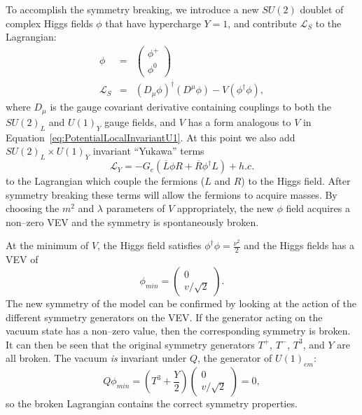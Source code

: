 To accomplish the symmetry breaking, we introduce a new $SU(2)$ doublet of
complex Higgs fields $\phi$ that have hypercharge $Y = 1$, and contribute
$\mathcal{L}_S$ to the Lagrangian:
\begin{eqnarray}
  \phi &=& \left(\begin{array}{c}\phi^+ \\ \phi^0\end{array}\right) \nonumber \\
  \mathcal{L}_S &=& (D_\mu \phi)^\dag(D^\mu \phi) - V(\phi^\dag\phi)\nonumber ,
\end{eqnarray}
where $D_\mu$ is the gauge covariant derivative containing couplings to both the
$SU(2)_L$ and $U(1)_Y$ gauge fields, and $V$ has a form analogous to $V$ in
Equation~\ref{eq:PotentialLocalInvariantU1}.  At this point we also add $SU(2)_L
\times U(1)_Y$ invariant ``Yukawa'' terms 
\begin{equation}
  \mathcal{L}_Y = -G_e(\overline L \phi R + \overline R \phi^\dag L) + h.c.
  \label{eq:YukawaTerms}
\end{equation}
to the Lagrangian which couple the fermions ($L$ and $R$) to the Higgs field.
After symmetry breaking these terms will allow the fermions to acquire masses.
By choosing the $m^2$ and $\lambda$ parameters of $V$ appropriately, the new
$\phi$ field acquires a non--zero VEV and the symmetry is spontaneously broken.

At the minimum of $V$, the Higgs field satisfies $\phi^\dag\phi =
\frac{\nu^2}{2}$ and the Higgs fields has a VEV of
\begin{equation}
  \phi_{min} = \left(\begin{array}{c} 0 \\ v/\sqrt{2} \end{array}\right).
    \nonumber
\end{equation}
The new symmetry of the model can be confirmed by looking at the action of the
different symmetry generators on the VEV\@.  If the generator acting on the
vacuum state has a non--zero value, then the corresponding symmetry is broken.
It can then be seen that the original symmetry generators $T^+$, $T^-$, $T^3$,
and $Y$ are all broken.  The vacuum \emph{is} invariant under $Q$, the generator
of $U(1)_{em}$:
\begin{equation}
  Q\phi_{min} = (T^3 + \frac{Y}{2})\left(\begin{array}{c} 0 \\ v/\sqrt{2}
  \end{array}\right) = 0 \nonumber,
\end{equation}
so the broken Lagrangian contains the correct symmetry properties.

